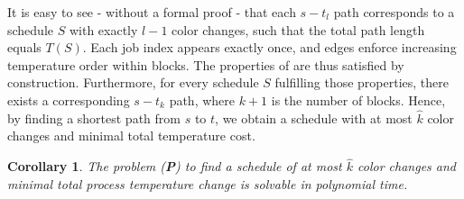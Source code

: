 \documentclass{article}
\newtheorem{corollary}[theorem]{Corollary}
\theoremstyle{definition}
\newcommand{\sched}{S}
\newcommand{\temp}{T}
\begin{document}
It is easy to see - without a formal proof - that each \(s - t_l\) path corresponds to a schedule \(\sched\) with exactly \(l-1\) color changes, such that the total path length equals \(\temp(\sched)\). Each job index appears exactly once, and edges enforce increasing temperature order within blocks. The properties of  are thus satisfied by construction. Furthermore, for every schedule \(\sched\) fulfilling those properties, there exists a corresponding \(s - t_k\) path, where \(k+1\) is the number of blocks. Hence, by finding a shortest path from \(s\) to \(t\), we obtain a schedule with at most \(\hat{k}\) color changes and minimal total temperature cost.

\begin{corollary}
The problem (\textbf{P}) to find a schedule of at most $\hat{k}$ color changes and minimal total process temperature change is solvable in polynomial time.
\end{corollary}
\end{document}
